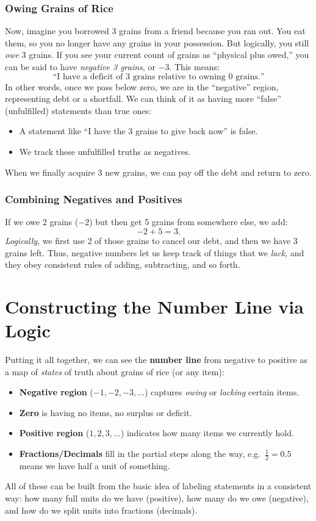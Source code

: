 \documentclass[12pt]{article}
\begin{document}
\subsubsection{Owing Grains of Rice}
Now, imagine you borrowed 3 grains from a friend because you ran out. You
eat them, so you no longer have any grains in your possession. But logically,
you still \emph{owe} 3 grains. If you see your current count of grains as
``physical plus owed,'' you can be said to have \emph{negative 3 grains},
or $-3$. This means:
\[
\text{``I have a deficit of 3 grains relative to owning 0 grains.''}
\]
In other words, once we pass below zero, we are in the ``negative'' region,
representing debt or a shortfall. We can think of it as having more
``false'' (unfulfilled) statements than true ones:
\begin{itemize}
  \item A statement like ``I have the 3 grains to give back now'' is false.
  \item We track these unfulfilled truths as negatives.
\end{itemize}
When we finally acquire 3 new grains, we can pay off the debt and return
to zero.

\subsubsection{Combining Negatives and Positives}
If we owe 2 grains ($-2$) but then get 5 grains from somewhere else, we
add:
\[
-2 + 5 = 3.
\]
\emph{Logically}, we first use 2 of those grains to cancel our debt, and
then we have 3 grains left. Thus, negative numbers let us keep track of
things that we \emph{lack}, and they obey consistent rules of adding,
subtracting, and so forth.

\section{Constructing the Number Line via Logic}
\label{sec:num-line}

Putting it all together, we can see the \textbf{number line} from negative
to positive as a map of \emph{states} of truth about grains of rice (or
any item):
\begin{itemize}
  \item \textbf{Negative region} ($-1, -2, -3, \dots$) captures \emph{owing} or
  \emph{lacking} certain items.
  \item \textbf{Zero} is having no items, no surplus or deficit.
  \item \textbf{Positive region} ($1, 2, 3, \dots$) indicates how many items
  we currently hold.
  \item \textbf{Fractions/Decimals} fill in the partial steps along the way,
  e.g.\ $\frac{1}{2} = 0.5$ means we have half a unit of something.
\end{itemize}
All of these can be built from the basic idea of labeling statements in a
consistent way: how many full units do we have (positive), how many do
we owe (negative), and how do we split units into fractions (decimals).
\end{document}
